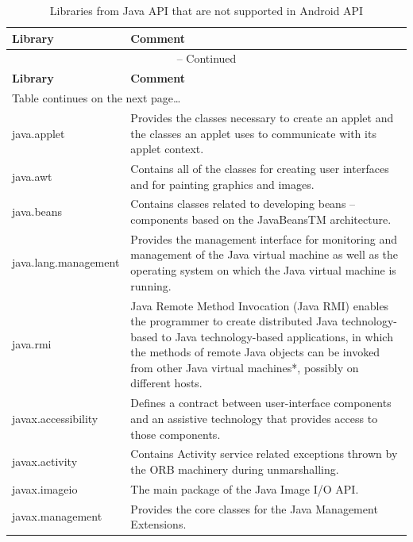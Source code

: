 \documentclass[11pt, oneside]{article}   	%
\begin{document}
\begin{longtable}{| p{5cm} | p{10cm} |}
\caption{Libraries from Java API that are not supported in Android API\label{table:comparison}}\\
\hline \hline
{\textbf{Library}} &
{\textbf{Comment}} \\
\hline
\endfirsthead

\multicolumn{2}{c}{{\tablename} \thetable{} -- Continued} \\[0.5ex]
\hline \hline
{\textbf{Library}} &
{\textbf{Comment}} \\
\hline
\endhead
\multicolumn{2}{l}{{Table continues on the next page\ldots}} \\
\endfoot
\hline \hline
\endlastfoot

\hline
java.applet & Provides the classes necessary to create an applet and the classes an applet uses to communicate with its applet context.
\\ \hline
java.awt & Contains all of the classes for creating user interfaces and for painting graphics and images.
\\ \hline
java.beans & Contains classes related to developing beans -- components based on the JavaBeansTM architecture.
\\ \hline
java.lang.management & Provides the management interface for monitoring and management of the Java virtual machine as well as the operating system on which the Java virtual machine is running.
\\ \hline
java.rmi & Java Remote Method Invocation (Java RMI) enables the programmer to create distributed Java technology-based to Java technology-based applications, in which the methods of remote Java objects can be invoked from other Java virtual machines*, possibly on different hosts.
\\ \hline
javax.accessibility & Defines a contract between user-interface components and an assistive technology that provides access to those components.
\\ \hline
javax.activity & Contains Activity service related exceptions thrown by the ORB machinery during unmarshalling.
\\ \hline
javax.imageio & The main package of the Java Image I/O API.
\\ \hline
javax.management & Provides the core classes for the Java Management Extensions.
\\ \hline

\end{longtable}
\end{document}
